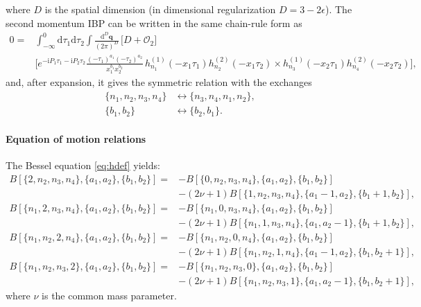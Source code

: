 \documentclass[a4paper,12pt]{article}
\newcommand{\FR}[2]{\displaystyle\frac{\,{#1}\,}{#2}}
\def\di{{\mathrm{d}}}
\def\ii{\mathrm{i}}
\def\ep{\epsilon}
\begin{document}
where $D$ is the spatial dimension (in dimensional regularization $D=3-2\ep$). The second momentum IBP can be written in the same chain-rule form as
\begin{align}
	0 ={}& \int_{-\infty}^0 \di\tau_1\di\tau_2\int \FR{\di^D \bm q}{(2\pi)^D}\,
	\Big[D+\mathcal{O}_2\Big]\nonumber\\
	&\Bigg[
	e^{-\ii P_1\tau_1-\ii P_2\tau_2}
	\frac{(-\tau_1)^{a_1}(-\tau_2)^{a_2}}{x_1^{b_1}x_2^{b_2}}\,
	h_{n_1}^{(1)}(-x_1\tau_1)h_{n_2}^{(2)}(-x_1\tau_2) \times h_{n_3}^{(1)}(-x_2\tau_1)h_{n_4}^{(2)}(-x_2\tau_2)\Bigg], \label{eq:momIBP_qk_chainrule}
\end{align}
and, after expansion, it gives the symmetric relation with the exchanges
\begin{align}
	\{n_1,n_2,n_3,n_4\} &\leftrightarrow \{n_3,n_4,n_1,n_2\}, \nonumber\\
	\{b_1,b_2\} &\leftrightarrow \{b_2,b_1\}. \nonumber
\end{align}

\paragraph{Equation of motion relations}
The Bessel equation \eqref{eq:hdef} yields:
\begin{align}
	B[\{2,n_2,n_3,n_4\},\{a_1,a_2\},\{b_1,b_2\}] = & - B[\{0,n_2,n_3,n_4\},\{a_1,a_2\},\{b_1,b_2\}]\nonumber      \\
	                                               & - (2\nu+1) B[\{1,n_2,n_3,n_4\},\{a_1-1,a_2\},\{b_1+1,b_2\}], \\
	B[\{n_1,2,n_3,n_4\},\{a_1,a_2\},\{b_1,b_2\}] = & - B[\{n_1,0,n_3,n_4\},\{a_1,a_2\},\{b_1,b_2\}]\nonumber      \\
	                                               & - (2\nu+1) B[\{n_1,1,n_3,n_4\},\{a_1,a_2-1\},\{b_1+1,b_2\}], \\
	B[\{n_1,n_2,2,n_4\},\{a_1,a_2\},\{b_1,b_2\}] = & - B[\{n_1,n_2,0,n_4\},\{a_1,a_2\},\{b_1,b_2\}]\nonumber      \\
	                                               & - (2\nu+1) B[\{n_1,n_2,1,n_4\},\{a_1-1,a_2\},\{b_1,b_2+1\}], \\
	B[\{n_1,n_2,n_3,2\},\{a_1,a_2\},\{b_1,b_2\}] = & - B[\{n_1,n_2,n_3,0\},\{a_1,a_2\},\{b_1,b_2\}]\nonumber      \\
	                                               & - (2\nu+1) B[\{n_1,n_2,n_3,1\},\{a_1,a_2-1\},\{b_1,b_2+1\}],
\end{align}
where $\nu$ is the common mass parameter.
\end{document}
